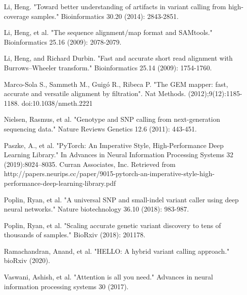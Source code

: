 \documentclass[]{article}
\begin{document}
\vspace{8pt}
Li, Heng. "Toward better understanding of artifacts in variant calling from high-coverage samples." Bioinformatics 30.20 (2014): 2843-2851.

\vspace{8pt}
Li, Heng, et al. "The sequence alignment/map format and SAMtools." Bioinformatics 25.16 (2009): 
2078-2079.


\vspace{8pt}
Li, Heng, and Richard Durbin. "Fast and accurate short read alignment with Burrows–Wheeler transform." Bioinformatics 25.14 (2009): 1754-1760.

\vspace{8pt}
Marco-Sola S., Sammeth M., Guigó R., Ribeca P. "The GEM mapper: fast, accurate and versatile alignment by filtration". Nat Methods. (2012);9(12):1185-1188. doi:10.1038/nmeth.2221

\vspace{8pt}
Nielsen, Rasmus, et al. "Genotype and SNP calling from next-generation sequencing data." Nature Reviews Genetics 12.6 (2011): 443-451.

\vspace{8pt}
Paszke, A., et al. "PyTorch: An Imperative Style, High-Performance Deep Learning Library." In Advances in Neural Information Processing Systems 32 (2019):8024–8035. Curran Associates, Inc. Retrieved from http://papers.neurips.cc/paper/9015-pytorch-an-imperative-style-high-performance-deep-learning-library.pdf


\vspace{8pt}
Poplin, Ryan, et al. "A universal SNP and small-indel variant caller using deep neural networks." Nature biotechnology 36.10 (2018): 983-987.

\vspace{8pt}
Poplin, Ryan, et al. "Scaling accurate genetic variant discovery to tens of thousands of samples." BioRxiv (2018): 201178.

\vspace{8pt}
Ramachandran, Anand, et al. "HELLO: A hybrid variant calling approach." bioRxiv (2020).
 

\vspace{8pt}
Vaswani, Ashish, et al. "Attention is all you need." Advances in neural information processing systems 30 (2017).
\end{document}
